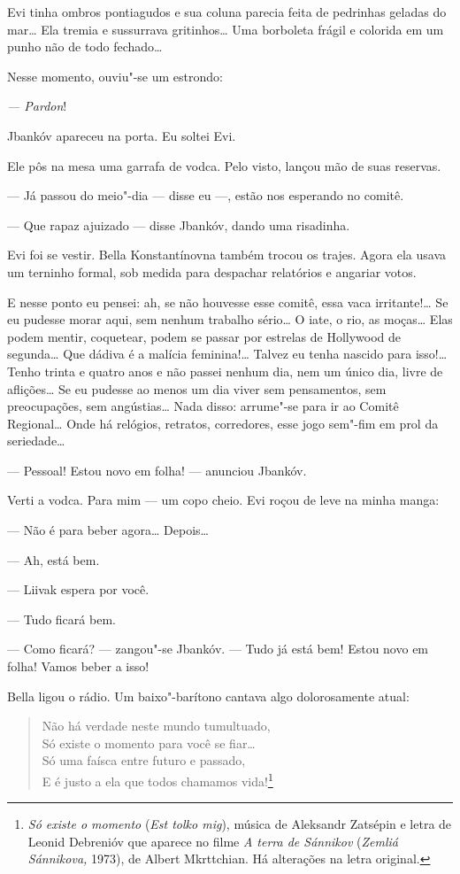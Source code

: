 Evi tinha ombros pontiagudos e sua coluna parecia feita de pedrinhas
geladas do mar\ldots{} Ela tremia e sussurrava gritinhos\ldots{} Uma borboleta
frágil e colorida em um punho não de todo fechado\ldots{}

Nesse momento, ouviu"-se um estrondo:

\emph{--- Pardon}!

Jbankóv apareceu na porta. Eu soltei Evi.

Ele pôs na mesa uma garrafa de vodca. Pelo visto, lançou mão de suas
reservas.

--- Já passou do meio"-dia --- disse eu ---, estão
nos esperando no comitê.

--- Que rapaz ajuizado --- disse Jbankóv, dando uma
risadinha.

Evi foi se vestir. Bella Konstantínovna também trocou os trajes. Agora
ela usava um terninho formal, sob medida para despachar relatórios e
angariar votos.

E nesse ponto eu pensei: ah, se não houvesse esse comitê, essa vaca
irritante!\ldots{} Se eu pudesse morar aqui, sem nenhum trabalho sério\ldots{} O
iate, o rio, as moças\ldots{} Elas podem mentir, coquetear, podem se passar
por estrelas de Hollywood de segunda\ldots{} Que dádiva é a malícia
feminina!\ldots{} Talvez eu tenha nascido para isso!\ldots{} Tenho trinta e quatro
anos e não passei nenhum dia, nem um único dia, livre de aflições\ldots{} Se
eu pudesse ao menos um dia viver sem pensamentos, sem preocupações, sem
angústias\ldots{} Nada disso: arrume"-se para ir ao Comitê Regional\ldots{} Onde há
relógios, retratos, corredores, esse jogo sem"-fim em prol da
seriedade\ldots{}

--- Pessoal! Estou novo em folha! --- anunciou Jbankóv.

Verti a vodca. Para mim --- um copo cheio. Evi roçou de leve na
minha manga:

--- Não é para beber agora\ldots{} Depois\ldots{}

--- Ah, está bem.

--- Liivak espera por você.

--- Tudo ficará bem.

--- Como ficará? --- zangou"-se Jbankóv. --- Tudo já
está bem! Estou novo em folha! Vamos beber a isso!

Bella ligou o rádio. Um baixo"-barítono cantava algo dolorosamente atual:

\begin{verse}
Não há verdade neste mundo tumultuado,\\
Só existe o momento para você se fiar\ldots{}\\
Só uma faísca entre futuro e passado,\\
E é justo a ela que todos chamamos vida!\footnote{\emph{Só existe o
  momento} (\emph{Est tolko mig}), música de Aleksandr Zatsépin e
  letra de Leonid Debrenióv que aparece no filme \emph{A terra
  de Sánnikov} (\emph{Zemliá Sánnikova,} 1973), de Albert
  Mkrttchian. Há alterações na letra original.}
\end{verse}

